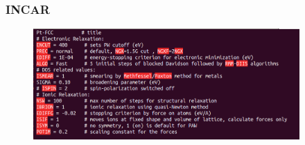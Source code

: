 \frame
{
\frametitle{\textrm{INCAR}}
\begin{figure}[h!]
\centering
\includegraphics[width=4.0in,viewport=0 0 720 292,clip]{Figures/Pt_FCC-INCAR.png}
\caption{\fontsize{6.2pt}{5.2pt}}%
\label{Pt_FCC:INCAR}
\end{figure}
{\fontsize{7.2pt}{5.2pt}\selectfont{对含有偶数个相同原子的晶格，自旋电子密度趋于相同，忽略自旋部分贡献}}
}
